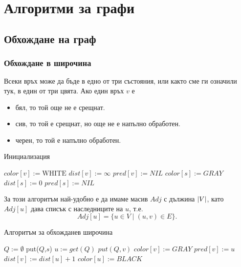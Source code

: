 \chapter {Алгоритми за графи}

\section{Обхождане на граф}

\subsection{Обхождане в широчина}

Всеки връх може да бъде в едно от три състояния, или както сме ги означили тук, в един от три цвята.
Ако един връх $v$ е
\begin{itemize}
\item 
  бял, то той още не е срещнат.
\item
  сив, то той е срещнат, но още не е напълно обработен.
\item
  черен, то той е напълно обработен.
\end{itemize}

\begin{algorithm}
  \caption{Инициализация}
  \label{alg:bfs-init}
  \begin{algorithmic}[1]
    \State $color[v] := \mbox{WHITE}$
    \State $dist[v] := \infty$
    \State $pred[v] := NIL$
    \EndFor
    \State $color[s]:=GRAY$
    \State $dist[s]:=0$
    \State $pred[s]:=NIL$
    \EndProcedure
  \end{algorithmic}
\end{algorithm}

За този алгоритъм най-удобно е да имаме масив $Adj$ с дължина $\vert{V}\vert$,
като $Adj[u]$ дава списък с наследниците на $u$, т.е.
\[Adj[u] = \{u \in V \mid (u,v) \in E\}.\]

\begin{algorithm}
  \caption{Алгоритъм за обхожданев широчина}
  \label{alg:bfs}
  \begin{algorithmic}[1]
    \State {}
    \State $Q := \emptyset$
    \State put($Q$,$s$)
    \State $u := get(Q)$
    \State $put(Q,v)$
    \State $color[v] := GRAY$
    \State $pred[v] := u$
    \State $dist[v] := dist[u] + 1$
    \EndIf
    \EndFor
    \State $color[u] := BLACK$
    \EndWhile
    \EndProcedure
  \end{algorithmic}
\end{algorithm}

